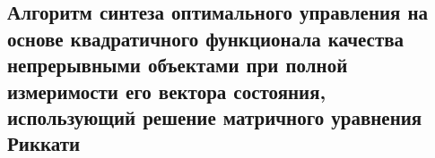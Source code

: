 \subsection{Алгоритм 	синтеза оптимального управления на основе квадратичного функционала 	качества непрерывными объектами при 	полной измеримости его вектора состояния, 	использующий решение матричного уравнения Риккати}